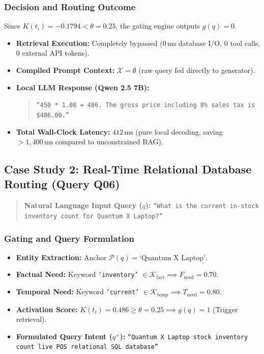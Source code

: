 \subsubsection{Decision and Routing Outcome}
Since $K(t_i) = -0.1794 < \theta = 0.25$, the gating engine outputs $g(q) = 0$. 
\begin{itemize}
    \item \textbf{Retrieval Execution:} Completely bypassed ($0\,\text{ms}$ database I/O, $0$ tool calls, $0$ external API tokens).
    \item \textbf{Compiled Prompt Context:} $\mathcal{X} = \emptyset$ (raw query fed directly to generator).
    \item \textbf{Local LLM Response (Qwen 2.5 7B):}
    \begin{quote}
        \texttt{``450 * 1.08 = 486. The gross price including 8\% sales tax is \$486.00.''}
    \end{quote}
    \item \textbf{Total Wall-Clock Latency:} $412\,\text{ms}$ (pure local decoding, saving $>1,400\,\text{ms}$ compared to unconstrained RAG).
\end{itemize}

\subsection{Case Study 2: Real-Time Relational Database Routing (Query Q06)}
\label{subsec:trace_q06}

\begin{quote}
\textbf{Natural Language Input Query ($q$):}  
\texttt{``What is the current in-stock inventory count for Quantum X Laptop?''}
\end{quote}

\subsubsection{Gating and Query Formulation}
\begin{itemize}
    \item \textbf{Entity Extraction:} Anchor $\mathcal{P}(q) = \text{`Quantum X Laptop'}$.
    \item \textbf{Factual Need:} Keyword \texttt{`inventory'} $\in \mathcal{K}_{\text{fact}} \implies F_{\text{need}} = 0.70$.
    \item \textbf{Temporal Need:} Keyword \texttt{`current'} $\in \mathcal{K}_{\text{temp}} \implies T_{\text{need}} = 0.80$.
    \item \textbf{Activation Score:} $K(t_i) = 0.486 \ge \theta = 0.25 \implies g(q) = 1$ (Trigger retrieval).
    \item \textbf{Formulated Query Intent ($q^+$):}  
    \texttt{``Quantum X Laptop stock inventory count live POS relational SQL database''}
\end{itemize}

